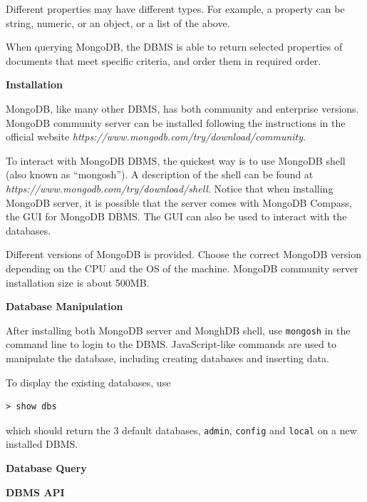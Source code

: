 Different properties may have different types. For example, a property can be string, numeric, or an object, or a list of the above.

When querying MongoDB, the DBMS is able to return selected properties of documents that meet specific criteria, and order them in required order.

\vspace{0.1in}
\noindent \textbf{Installation}
\vspace{0.1in}

MongoDB, like many other DBMS, has both community and enterprise versions. MongoDB community server can be installed following the instructions in the official website \textit{https://www.mongodb.com/try/download/community}.

To interact with MongoDB DBMS, the quickest way is to use MongoDB shell (also known as ``mongosh''). A description of the shell can be found at \textit{https://www.mongodb.com/try/download/shell}. Notice that when installing MongoDB server, it is possible that the server comes with MongoDB Compass, the GUI for MongoDB DBMS. The GUI can also be used to interact with the databases.

Different versions of MongoDB is provided. Choose the correct MongoDB version depending on the CPU and the OS of the machine. MongoDB community server installation size is about 500MB.

\vspace{0.1in}
\noindent \textbf{Database Manipulation}
\vspace{0.1in}

After installing both MongoDB server and MonghDB shell, use \verb|mongosh| in the command line to login to the DBMS. JavaScript-like commands are used to manipulate the database, including creating databases and inserting data.

To display the existing databases, use
\begin{lstlisting}
> show dbs
\end{lstlisting}
which should return the 3 default databases, \verb|admin|, \verb|config| and \verb|local| on a new installed DBMS.

\vspace{0.1in}
\noindent \textbf{Database Query}
\vspace{0.1in}




\vspace{0.1in}
\noindent \textbf{DBMS API}
\vspace{0.1in}




